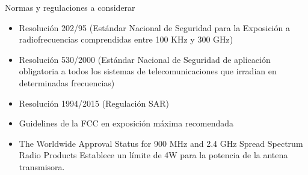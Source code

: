 Normas y regulaciones a considerar

\begin{itemize}
\item Resolución 202/95  (Estándar Nacional de Seguridad para la Exposición a radiofrecuencias comprendidas entre 100 KHz y 300 GHz)
\item Resolución 530/2000 (Estándar Nacional de Seguridad de aplicación obligatoria a todos los sistemas de telecomunicaciones que irradian en determinadas frecuencias)
\item Resolución 1994/2015 (Regulación SAR)
\item Guidelines de la FCC en exposición máxima recomendada
\item The Worldwide Approval Status for 900 MHz and 2.4 GHz Spread Spectrum Radio Products
\quad Establece un límite de 4W para la potencia de la antena transmisora.

\end{itemize}










